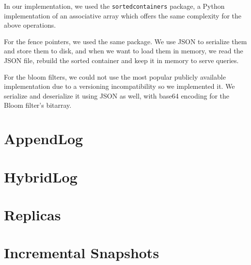 In our implementation, we used the \verb|sortedcontainers| package, a Python implementation of an associative array which offers the same complexity for the above operations.

For the fence pointers, we used the same package. We use JSON to serialize them and store them to disk, and when we want to load them in memory, we read the JSON file, rebuild the sorted container and keep it in memory to serve queries.

For the bloom filters, we could not use the most popular publicly available implementation due to a versioning incompatibility so we implemented it. We serialize and deserialize it using JSON as well, with base64 encoding for the Bloom filter's bitarray.




\section{AppendLog}



\section{HybridLog}

\section{Replicas}
\label{section-replicas}


\section{Incremental Snapshots}
\label{section-incremental-snapshots}
